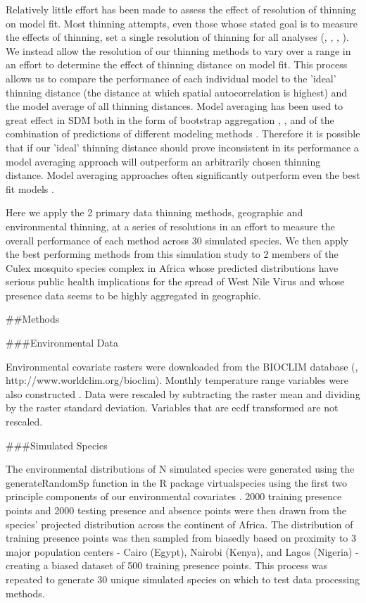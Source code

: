 Relatively little effort has been made to assess the effect of resolution of thinning on model fit. Most thinning attempts, even those whose stated goal is to measure the effects of thinning, set a single resolution of thinning for all analyses (\cite{Boria:2014fs}, \cite{Varela:2014ck}, \cite{Fourcade:2014ka}, \cite{Phillips:2006ff}). We instead allow the resolution of our thinning methods to vary over a range in an effort to determine the effect of thinning distance on model fit. This process allows us to compare the performance of each individual model to the 'ideal' thinning distance (the distance at which spatial autocorrelation is highest) and the model average of all thinning distances. Model averaging has been used to great effect in SDM both in the form of bootstrap aggregation \cite{Breiman:1996fi}, \cite{Drake:2014fk}, \cite{Drake:2015kl} and of the combination of predictions of different modeling methods \cite{Marmion:2009ef}. Therefore it is possible that if our 'ideal' thinning distance should prove inconsistent in its performance a model averaging approach will outperform an arbitrarily chosen thinning distance. Model averaging approaches often significantly outperform even the best fit models \cite{Marmion:2009ef}.

Here we apply the 2 primary data thinning methods, geographic and environmental thinning, at a series of resolutions in an eﬀort to measure the overall performance of each method across 30 simulated species. We then apply the best performing methods from this simulation study to 2 members of the Culex mosquito species complex in Africa whose predicted distributions have serious public health implications for the spread of West Nile Virus and whose presence data seems to be highly aggregated in geographic. 


##Methods

###Environmental Data

Environmental covariate rasters were downloaded from the BIOCLIM database (\cite{Hijmans:2005wv}, http://www.worldclim.org/bioclim). Monthly temperature range variables were also constructed \cite{Drake:2013un}. Data were rescaled by subtracting the raster mean and dividing by the raster standard deviation. Variables that are ecdf transformed are not rescaled.

###Simulated Species

The environmental distributions of N simulated species were generated using the generateRandomSp function in the R package virtualspecies using the first two principle components of our environmental covariates \cite{Leroy:2015jt}. 2000 training presence points and 2000 testing presence and absence points were then drawn from the species’ projected distribution across the continent of Africa. The distribution of training presence points was then sampled from biasedly based on proximity to 3 major population centers - Cairo (Egypt), Nairobi (Kenya), and Lagos (Nigeria) - creating a biased dataset of 500 training presence points. This process was repeated to generate 30 unique simulated species on which to test data processing methods. 

